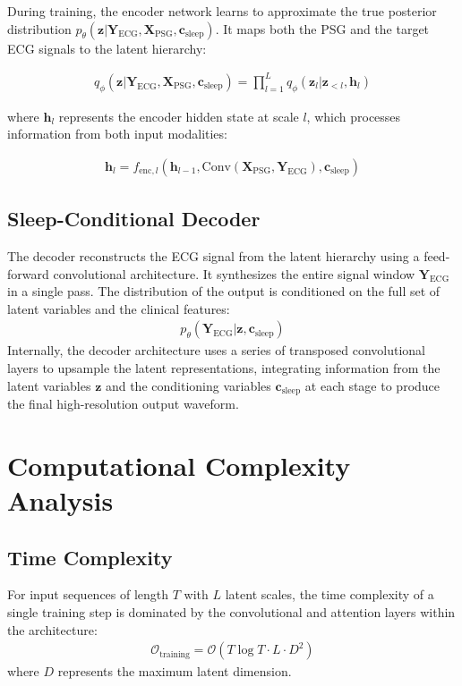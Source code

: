 \documentclass[11pt,en]{elegantpaper}
\begin{document}
During training, the encoder network learns to approximate the true posterior distribution $p_\theta(\mathbf{z} | \mathbf{Y}_{\text{ECG}}, \mathbf{X}_{\text{PSG}}, \mathbf{c}_{\text{sleep}})$. It maps both the PSG and the target ECG signals to the latent hierarchy:

\begin{align}
q_\phi(\mathbf{z} | \mathbf{Y}_{\text{ECG}}, \mathbf{X}_{\text{PSG}}, \mathbf{c}_{\text{sleep}}) = \prod_{l=1}^L q_\phi(\mathbf{z}_l | \mathbf{z}_{<l}, \mathbf{h}_l)
\end{align}

where $\mathbf{h}_l$ represents the encoder hidden state at scale $l$, which processes information from both input modalities:

\begin{align}
\mathbf{h}_l = f_{\text{enc},l}(\mathbf{h}_{l-1}, \text{Conv}(\mathbf{X}_{\text{PSG}}, \mathbf{Y}_{\text{ECG}}), \mathbf{c}_{\text{sleep}})
\end{align}

\subsection{Sleep-Conditional Decoder}

The decoder reconstructs the ECG signal from the latent hierarchy using a feed-forward convolutional architecture. It synthesizes the entire signal window $\mathbf{Y}_{\text{ECG}}$ in a single pass. The distribution of the output is conditioned on the full set of latent variables and the clinical features:
\begin{align}
p_\theta(\mathbf{Y}_{\text{ECG}} | \mathbf{z}, \mathbf{c}_{\text{sleep}})
\end{align}
Internally, the decoder architecture uses a series of transposed convolutional layers to upsample the latent representations, integrating information from the latent variables $\mathbf{z}$ and the conditioning variables $\mathbf{c}_{\text{sleep}}$ at each stage to produce the final high-resolution output waveform.

\section{Computational Complexity Analysis}

\subsection{Time Complexity}
For input sequences of length $T$ with $L$ latent scales, the time complexity of a single training step is dominated by the convolutional and attention layers within the architecture:
\begin{align}
\mathcal{O}_{\text{training}} = \mathcal{O}(T \log T \cdot L \cdot D^2)
\end{align}
where $D$ represents the maximum latent dimension.
\end{document}

